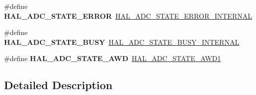 \begin{DoxyCompactItemize}
\item 
\mbox{\label{group___h_a_l___a_d_c___aliased___defines_ga83e3447e639d1a9019732255700ac23a}} 
\#define {\bfseries H\+A\+L\+\_\+\+A\+D\+C\+\_\+\+S\+T\+A\+T\+E\+\_\+\+E\+R\+R\+OR}~\hyperlink{group___a_d_c___exported___types_ga65b592627f1f9277f4b89bfc33a9e641}{H\+A\+L\+\_\+\+A\+D\+C\+\_\+\+S\+T\+A\+T\+E\+\_\+\+E\+R\+R\+O\+R\+\_\+\+I\+N\+T\+E\+R\+N\+AL}
\item 
\mbox{\label{group___h_a_l___a_d_c___aliased___defines_ga063cc0bfc15747a4c96d2868273a4516}} 
\#define {\bfseries H\+A\+L\+\_\+\+A\+D\+C\+\_\+\+S\+T\+A\+T\+E\+\_\+\+B\+U\+SY}~\hyperlink{group___a_d_c___exported___types_ga7055248355e179ee208d23bd2ce8ba69}{H\+A\+L\+\_\+\+A\+D\+C\+\_\+\+S\+T\+A\+T\+E\+\_\+\+B\+U\+S\+Y\+\_\+\+I\+N\+T\+E\+R\+N\+AL}
\item 
\mbox{\label{group___h_a_l___a_d_c___aliased___defines_ga3147b9039ee1bc08da805d57a5136cd1}} 
\#define {\bfseries H\+A\+L\+\_\+\+A\+D\+C\+\_\+\+S\+T\+A\+T\+E\+\_\+\+A\+WD}~\hyperlink{group___a_d_c___exported___types_ga39ce295171a5e608097017fda4cfd7d5}{H\+A\+L\+\_\+\+A\+D\+C\+\_\+\+S\+T\+A\+T\+E\+\_\+\+A\+W\+D1}
\end{DoxyCompactItemize}


\subsection{Detailed Description}
